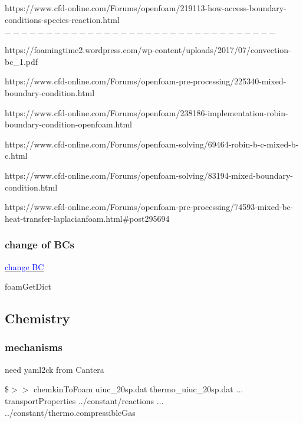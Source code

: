 \documentclass[a4paper, 12pt]{article}
\numberwithin{equation}{section}
\newcommand{\code}{\fontfamily{pcr}\selectfont}
\newcommand{\blue}[1]{\textcolor{blue}{#1}}
\begin{document}
            https://www.cfd-online.com/Forums/openfoam/219113-how-access-boundary-conditions-species-reaction.html

            $---------------------------------$

            https://foamingtime2.wordpress.com/wp-content/uploads/2017/07/convection-bc\_1.pdf

            https://www.cfd-online.com/Forums/openfoam-pre-processing/225340-mixed-boundary-condition.html

            https://www.cfd-online.com/Forums/openfoam/238186-implementation-robin-boundary-condition-openfoam.html

            https://www.cfd-online.com/Forums/openfoam-solving/69464-robin-b-c-mixed-b-c.html

            https://www.cfd-online.com/Forums/openfoam-solving/83194-mixed-boundary-condition.html

            https://www.cfd-online.com/Forums/openfoam-pre-processing/74593-mixed-bc-heat-transfer-laplacianfoam.html\#post295694

        \subsubsection{change of BCs}

            \href{https://www.cfd-online.com/Forums/openfoam-solving/235527-how-change-boundary-condition-after-specific-timein-parallel-solver.html}{\blue{change BC}}

            foamGetDict

    \subsection{Chemistry}

        \subsubsection{mechanisms}

            need {\code yaml2ck} from Cantera

            \$$>>$ {\code chemkinToFoam uiuc\_20sp.dat thermo\_uiuc\_20sp.dat ... \\ transportProperties ../constant/reactions ... \\ ../constant/thermo.compressibleGas}

            \begin{center}
            \end{center}
\end{document}
